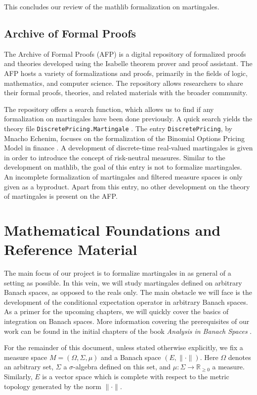 This concludes our review of the \textsf{mathlib} formalization on martingales.

\subsection{Archive of Formal Proofs}

The Archive of Formal Proofs (\textsf{AFP}) is a digital repository of formalized proofs and theories developed using the Isabelle theorem prover and proof assistant. The \textsf{AFP}  hosts a variety of formalizations and proofs, primarily in the fields of logic, mathematics, and computer science. The repository allows researchers to share their formal proofs, theories, and related materials with the broader community.

The repository offers a search function, which allows us to find if any formalization on martingales have been done previously. A quick search yields the theory file \texttt{DiscretePricing.Martingale} \cite{DiscretePricing-AFP}. The entry \texttt{DiscretePricing}, by Mnacho Echenim, focuses on the formalization of the Binomial Options Pricing Model in finance \cite{EchenimPeltier}. A development of discrete-time real-valued martingales is given in order to introduce the concept of risk-neutral measures. Similar to the development on \textsf{mathlib}, the goal of this entry is not to formalize martingales. An incomplete formalization of martingales and filtered measure spaces is only given as a byproduct.
Apart from this entry, no other development on the theory of martingales is present on the \textsf{AFP}.

\section{Mathematical Foundations and Reference Material}

The main focus of our project is to formalize martingales in as general of a setting as possible. In this vein, we will study martingales defined on arbitrary Banach spaces, as opposed to the reals only. The main obstacle we will face is the development of the conditional expectation operator in arbitrary Banach spaces. As a primer for the upcoming chapters, we will quickly cover the basics of integration on Banach spaces. More information covering the prerequisites of our work can be found in the initial chapters of the book \textit{Analysis in Banach Spaces} \cite{Hytoenen_2016}.

\begin{remark}
	For the remainder of this document, unless stated otherwise explicitly, we fix a measure space $M = (\Omega, \Sigma, \mu)$ and a Banach space $(E, \lVert \cdot \rVert)$. Here $\Omega$ denotes an arbitrary set, $\Sigma$ a $\sigma$-algebra defined on this set, and $\mu : \Sigma \rightarrow \mathbb{R}_{\ge 0}$ a measure. Similarly, $E$ is a vector space which is complete with respect to the metric topology generated by the norm $\lVert \cdot \rVert$.
\end{remark}

